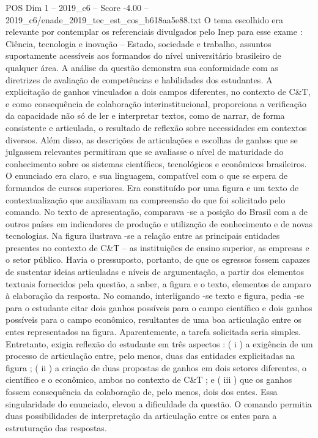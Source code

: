 \begin{textsample}{POS Dim 1 – 2019\_c6 – Score -4.00 – 2019\_c6/enade\_2019\_tec\_est\_cos\_b618aa5e88.txt}
O tema escolhido era relevante por contemplar os referenciais divulgados pelo Inep para esse exame : Ciência, tecnologia e inovação – Estado, sociedade e trabalho, assuntos supostamente acessíveis aos formandos do nível universitário brasileiro de qualquer área.
A análise da questão demonstra sua conformidade com as diretrizes de avaliação de competências e habilidades dos estudantes.
A explicitação de ganhos vinculados a dois campos diferentes, no contexto de C\&T, e como consequência de colaboração interinstitucional, proporciona a verificação da capacidade não só de ler e interpretar textos, como de narrar, de forma consistente e articulada, o resultado de reflexão sobre necessidades em contextos diversos.
Além disso, as descrições de articulações e escolhas de ganhos que se julgassem relevantes permitiram que se avaliasse o nível de maturidade do conhecimento sobre os sistemas científicos, tecnológicos e econômicos brasileiros.
O enunciado era claro, e sua linguagem, compatível com o que se espera de formandos de cursos superiores.
Era constituído por uma figura e um texto de contextualização que auxiliavam na compreensão do que foi solicitado pelo comando.
No texto de apresentação, comparava -se a posição do Brasil com a de outros países em indicadores de produção e utilização de conhecimento e de novas tecnologias.
Na figura ilustrava -se a relação entre as principais entidades presentes no contexto de C\&T – as instituições de ensino superior, as empresas e o setor público.
Havia o pressuposto, portanto, de que os egressos fossem capazes de sustentar ideias articuladas e níveis de argumentação, a partir dos elementos textuais fornecidos pela questão, a saber, a figura e o texto, elementos de amparo à elaboração da resposta.
No comando, interligando -se texto e figura, pedia -se para o estudante citar dois ganhos possíveis para o campo científico e dois ganhos possíveis para o campo econômico, resultantes de uma boa articulação entre os entes representados na figura.
Aparentemente, a tarefa solicitada seria simples.
Entretanto, exigia reflexão do estudante em três aspectos : ( i ) a exigência de um processo de articulação entre, pelo menos, duas das entidades explicitadas na figura ; ( ii ) a criação de duas propostas de ganhos em dois setores diferentes, o científico e o econômico, ambos no contexto de C\&T ; e ( iii ) que os ganhos fossem consequência da colaboração de, pelo menos, dois dos entes.
Essa singularidade do enunciado, elevou a dificuldade da questão.
O comando permitia duas possibilidades de interpretação da articulação entre os entes para a estruturação das respostas.

\end{textsample}
